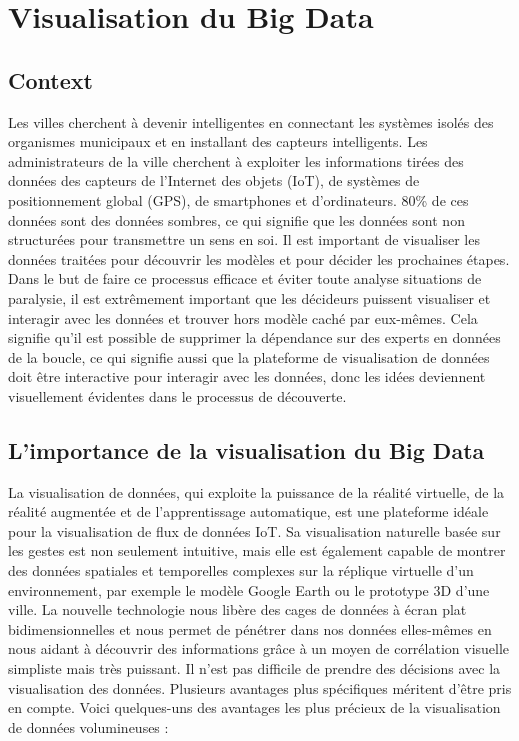 \documentclass[french, a4paper, 12pt]{report}
\begin{document}
\section{Visualisation du Big Data }
\subsection{Context}
Les villes cherchent à devenir intelligentes en connectant les systèmes isolés des organismes municipaux et en installant des capteurs intelligents. Les administrateurs de la ville cherchent à exploiter les informations tirées des données des capteurs de l'Internet des objets (IoT), de systèmes de positionnement global (GPS), de smartphones et d'ordinateurs. 80\% de ces données sont des données sombres, ce qui signifie que les données sont non structurées pour transmettre un sens en soi.
Il est important de visualiser les données traitées pour découvrir les modèles et pour décider les prochaines étapes. Dans le but de faire ce processus efficace et éviter toute analyse situations de paralysie, il est extrêmement important que les décideurs puissent visualiser et interagir avec les données et trouver hors modèle caché par eux-mêmes.
Cela signifie qu'il est possible de supprimer la dépendance sur des experts en données de la boucle, ce qui signifie aussi que la plateforme de visualisation de données doit être interactive pour interagir avec les données, donc les idées deviennent visuellement évidentes dans le processus de découverte.

\subsection{L’importance de la visualisation du Big Data}
La visualisation de données, qui exploite la puissance de la réalité virtuelle, de la réalité augmentée et de l’apprentissage automatique, est une plateforme idéale pour la visualisation de flux de données IoT. Sa visualisation naturelle basée sur les gestes est non seulement intuitive, mais elle est également capable de montrer des données spatiales et temporelles complexes sur la réplique virtuelle d’un environnement, par exemple le modèle Google Earth ou le prototype 3D d’une ville.
La nouvelle technologie nous libère des cages de données à écran plat bidimensionnelles et nous permet de pénétrer dans nos données elles-mêmes en nous aidant à découvrir des informations grâce à un moyen de corrélation visuelle simpliste mais très puissant. Il n’est pas difficile de prendre des décisions avec la visualisation des données.
Plusieurs avantages plus spécifiques méritent d’être pris en compte. Voici quelques-uns des avantages les plus précieux de la visualisation de données volumineuses :
\end{document}
